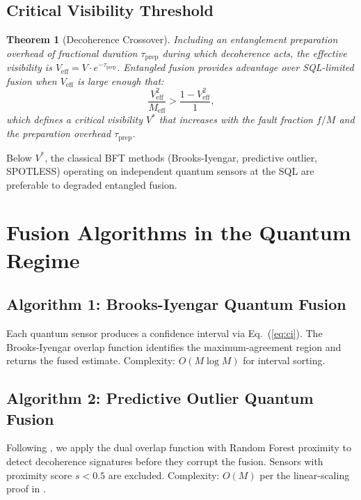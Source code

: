 \documentclass[twocolumn,11pt]{article}
\newtheorem{theorem}{Theorem}
\begin{document}
\subsection{Critical Visibility Threshold}

\begin{theorem}[Decoherence Crossover]
\label{thm:crossover}
Including an entanglement preparation overhead of fractional
duration $\tau_{\mathrm{prep}}$ during which decoherence acts,
the effective visibility is $V_{\mathrm{eff}} = V \cdot e^{-\tau_{\mathrm{prep}}}$.
Entangled fusion provides advantage over SQL-limited fusion
when $V_{\mathrm{eff}}$ is large enough that:
\begin{equation}
    \frac{V_{\mathrm{eff}}^2}{M_{\mathrm{eff}}} >
    \frac{1 - V_{\mathrm{eff}}^2}{1},
    \label{eq:crossover_condition}
\end{equation}
which defines a critical visibility $V^*$ that increases with
the fault fraction $f/M$ and the preparation overhead
$\tau_{\mathrm{prep}}$.
\end{theorem}

Below $V^*$, the classical BFT methods (Brooks-Iyengar,
predictive outlier, SPOTLESS) operating on independent quantum
sensors at the SQL are preferable to degraded entangled fusion.


\section{Fusion Algorithms in the Quantum Regime}
\label{sec:algorithms}

\subsection{Algorithm 1: Brooks-Iyengar Quantum Fusion}

Each quantum sensor produces a confidence interval via
Eq.~(\ref{eq:ci}).
The Brooks-Iyengar overlap function identifies the
maximum-agreement region and returns the fused estimate.
Complexity: $O(M \log M)$ for interval sorting.

\subsection{Algorithm 2: Predictive Outlier Quantum Fusion}

Following \cite{iyer2015virtual}, we apply the dual overlap
function with Random Forest proximity to detect decoherence
signatures before they corrupt the fusion.
Sensors with proximity score $s < 0.5$ are excluded.
Complexity: $O(M)$ per the linear-scaling proof in
\cite{iyer2015virtual}.
\end{document}

